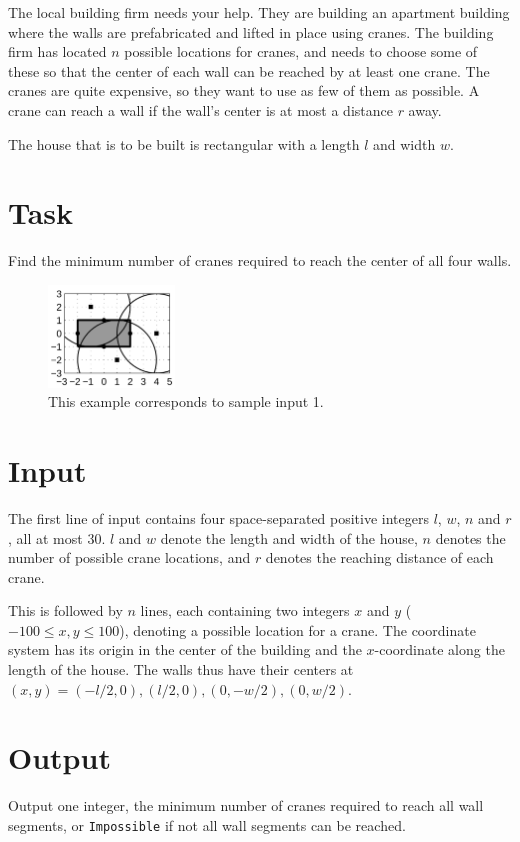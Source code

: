 The local building firm needs your help. They are building
an apartment building where the walls are prefabricated and lifted
in place using cranes. The building firm has located $n$ possible
locations for cranes, and needs to choose some of these so that
the center of each wall can be reached by at least one crane. The
cranes are quite expensive, so they want to use as few of them as
possible. A crane can reach a wall if the wall's center is at most a
distance $r$ away.

The house that is to be built is rectangular with a length $l$ and
width $w$.

\section*{Task}
Find the minimum number of cranes required to reach the center of all four walls.

\begin{figure}[h]
    \centering
    \includegraphics[width=0.3\textwidth]{walls.png}
    \caption{This example corresponds to sample input 1.}
\end{figure}

\section*{Input}
The first line of input contains four space-separated positive integers $l$, $w$, $n$ and $r$, all at most $30$.
$l$ and $w$ denote the length and width of the house, $n$ denotes the number of possible crane locations, and $r$ denotes the reaching distance of each crane.

This is followed by $n$ lines, each containing two integers $x$ and $y$ ($-100 \le x, y \le 100$), denoting a possible location for a crane.
The coordinate system has its origin in the center of the building and the $x$-coordinate along the length of the house.
The walls thus have their centers at $(x, y) = (-l/2, 0),(l/2, 0),(0, -w/2),(0, w/2)$.

\section*{Output}
Output one integer, the minimum number of cranes required to reach all wall segments, or \texttt{Impossible} if not
all wall segments can be reached.
